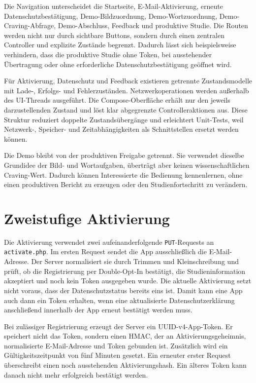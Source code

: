 Die Navigation unterscheidet die Startseite, E-Mail-Aktivierung, erneute Datenschutzbestätigung, Demo-Bildzuordnung, Demo-Wortzuordnung, Demo-Craving-Abfrage, Demo-Abschluss, Feedback und produktive Studie. Die Routen werden nicht nur durch sichtbare Buttons, sondern durch einen zentralen Controller und explizite Zustände begrenzt. Dadurch lässt sich beispielsweise verhindern, dass die produktive Studie ohne Token, bei ausstehender Übertragung oder ohne erforderliche Datenschutzbestätigung geöffnet wird.

Für Aktivierung, Datenschutz und Feedback existieren getrennte Zustandsmodelle mit Lade-, Erfolgs- und Fehlerzuständen. Netzwerkoperationen werden außerhalb des UI-Threads ausgeführt. Die Compose-Oberfläche erhält nur den jeweils darzustellenden Zustand und löst klar abgegrenzte Controlleraktionen aus. Diese Struktur reduziert doppelte Zustandsübergänge und erleichtert Unit-Tests, weil Netzwerk-, Speicher- und Zeitabhängigkeiten als Schnittstellen ersetzt werden können.

Die Demo bleibt von der produktiven Freigabe getrennt. Sie verwendet dieselbe Grundidee der Bild- und Wortaufgaben, überträgt aber keinen wissenschaftlichen Craving-Wert. Dadurch können Interessierte die Bedienung kennenlernen, ohne einen produktiven Bericht zu erzeugen oder den Studienfortschritt zu verändern.

\section{Zweistufige Aktivierung}

Die Aktivierung verwendet zwei aufeinanderfolgende \texttt{PUT}-Requests an \texttt{activate.php}. Im ersten Request sendet die App ausschließlich die E-Mail-Adresse. Der Server normalisiert sie durch Trimmen und Kleinschreibung und prüft, ob die Registrierung per Double-Opt-In bestätigt, die Studieninformation akzeptiert und noch kein Token ausgegeben wurde. Die aktuelle Aktivierung setzt nicht voraus, dass der Datenschutzstatus bereits eins ist. Damit kann eine App auch dann ein Token erhalten, wenn eine aktualisierte Datenschutzerklärung anschließend innerhalb der App erneut bestätigt werden muss.

Bei zulässiger Registrierung erzeugt der Server ein UUID-v4-App-Token. Er speichert nicht das Token, sondern einen HMAC, der an Aktivierungsgeheimnis, normalisierte E-Mail-Adresse und Token gebunden ist. Zusätzlich wird ein Gültigkeitszeitpunkt von fünf Minuten gesetzt. Ein erneuter erster Request überschreibt einen noch ausstehenden Aktivierungshash. Ein älteres Token kann danach nicht mehr erfolgreich bestätigt werden.


